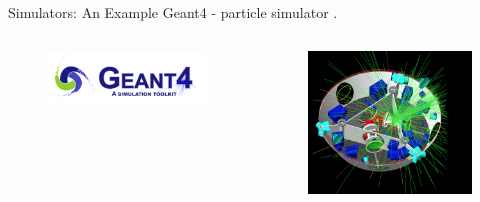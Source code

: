 \documentclass[12pt, aspectratio=169]{beamer}
\begin{document}
\begin{frame}{Simulators: An Example}
    Geant4 - particle simulator \parencite{cern_geant4_nodate}.
    

    \begin{columns}
		\begin{column}{0.5\textwidth}
		\begin{figure}
			\centering
			\includegraphics[width=0.8\linewidth]{"images/geant4_logo.png"}\label{fig:g4_logo}
		\end{figure}
		\end{column}
			
		\begin{column}{0.5\textwidth}
		\begin{figure}
			\centering
			\includegraphics[width=0.75\linewidth]{"images/geant4.png"}\label{fig:g4}
		\end{figure}
		\end{column}
	\end{columns}
\end{frame}
\end{document}

